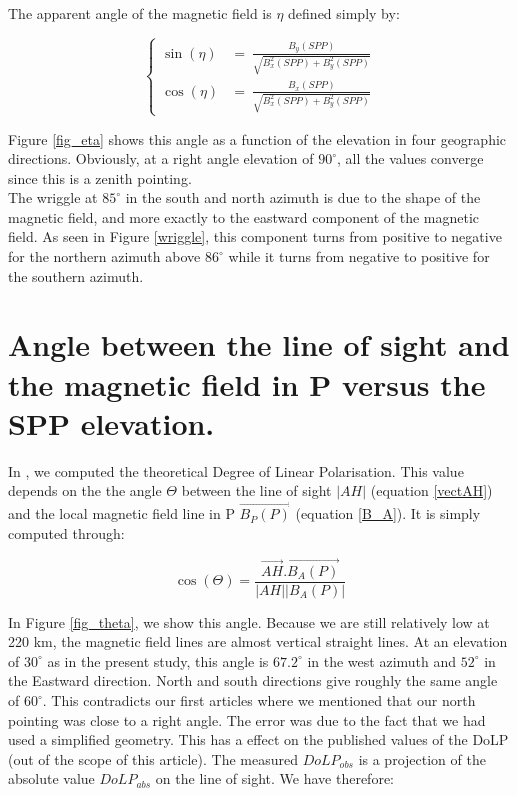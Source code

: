 \documentclass[draft,jgrga]{agutexSI}
\begin{document}
\begin{article}
The apparent angle of the magnetic field is $\eta$ defined simply by:

\begin{equation}
\label{longP2}
\left\{ \begin{array}{cc}
\sin(\eta) &=\  \frac{B_y(SPP)}{\sqrt{B_x^2(SPP)+B_y^2(SPP)}} \\
\cos(\eta) &=\  \frac{B_x(SPP)}{\sqrt{B_x^2(SPP)+B_y^2(SPP)}}  
\end{array} \right.
\end{equation}

Figure \ref{fig_eta} shows this angle as a function of the elevation in four geographic directions. Obviously, at a right angle elevation of $90^\circ$, all the values converge since this is a zenith pointing.   \\
The wriggle at $85^\circ$ in the south and north azimuth is due to the shape of the magnetic field, and more exactly to the eastward component of the magnetic field. As seen in Figure \ref{wriggle}, this component turns from positive to negative for the northern azimuth above $86^\circ$ while it turns from negative to positive for the southern azimuth.

\section{Angle between the line of sight and the magnetic field in P versus the SPP elevation.}
In \cite{Lilensten_pola2015}, we computed the theoretical Degree of Linear Polarisation. This value depends on the the angle $\Theta$ between the line of sight $\vert AH \vert$ (equation \ref{vectAH}) and the local magnetic field line in P $\overrightarrow{B_P(P)}$ (equation \ref{B_A}). It is simply computed through:

\begin{equation}
\cos(\Theta)= \frac{\overrightarrow{AH}.\overrightarrow{B_A(P)}}{\vert AH \vert\vert B_A(P)\vert}
\end{equation}

In Figure \ref{fig_theta}, we show this angle. Because we are still relatively low at 220 km, the magnetic field lines are almost vertical straight lines. At an elevation of $30^\circ$ as in the present study, this angle is $67.2^\circ$ in the west azimuth and $52^\circ$ in the Eastward direction. North and south directions give roughly the same angle of $60^\circ$. This contradicts our first articles \citep{Lilensten_decouverte} where we mentioned that our north pointing was close to a right angle. The error was due to the fact that we had used a simplified geometry. This has a effect on the published values of the DoLP (out of the scope of this article). The measured $DoLP_{obs}$ is a projection of the absolute value $DoLP_{abs}$ on the line of sight. We have therefore:


\end{article}
\end{document}

